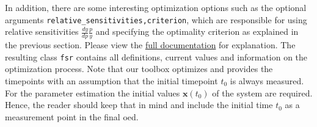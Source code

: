 \documentclass[graybox]{svmult}
\newcommand{\mbx}{\mathbf{x}}
\begin{document}
In addition, there are some interesting optimization options such as the optional arguments \texttt{relative_sensitivities,criterion}, which are responsible for using relative sensitivities $\tfrac{dy}{dp}\tfrac{p}{y}$ and specifying the optimality criterion as explained in the previous section.
Please view the \href{https://spatial-systems-biology-freiburg.github.io/FisInMa/}{full documentation} for explanation.
The resulting class \texttt{fsr} contains all definitions, current values and information on the optimization process.
Note that our toolbox optimizes and provides the timepoints with an assumption that the initial timepoint $t_0$ is always measured.
For the parameter estimation the initial values $\mbx(t_0)$ of the system are required.
Hence, the reader should keep that in mind and include the initial time $t_0$ as a measurement point in the final \ac{oed}.
%
\end{document}
